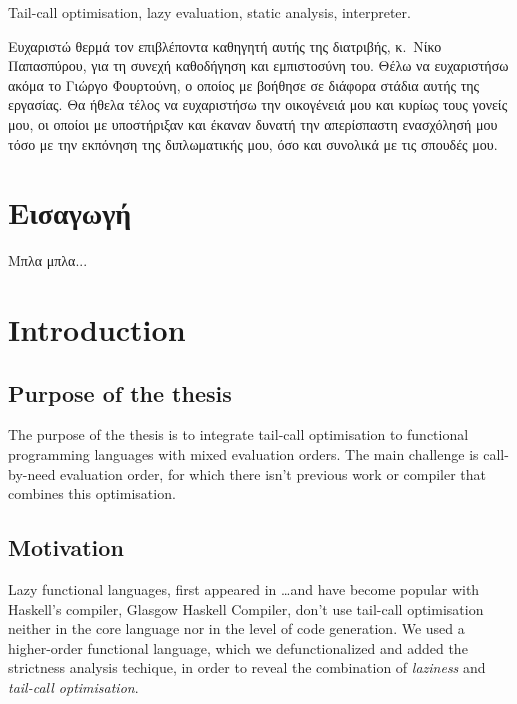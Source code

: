 \documentclass[diploma]{softlab-thesis}
\begin{document}
\begin{abstracten}
\begin{keywordsen}
Tail-call optimisation, lazy evaluation, static analysis, interpreter. 
\end{keywordsen}
\end{abstracten}



\begin{acknowledgementsgr}
Ευχαριστώ θερμά τον επιβλέποντα καθηγητή αυτής της διατριβής,
κ.~Νίκο Παπασπύρου, για τη συνεχή καθοδήγηση και εμπιστοσύνη
του. Θέλω να ευχαριστήσω ακόμα
το Γιώργο Φουρτούνη, ο οποίος με βοήθησε σε
διάφορα στάδια αυτής της εργασίας.  Θα ήθελα τέλος να ευχαριστήσω
την οικογένειά μου και κυρίως τους γονείς μου, οι οποίοι με
υποστήριξαν και έκαναν δυνατή την απερίσπαστη ενασχόλησή μου τόσο
με την εκπόνηση της διπλωματικής μου, όσο και συνολικά με τις
σπουδές μου.
\end{acknowledgementsgr}



\tableofcontents
\listoftables
\listoffigures



\mainmatter

\chapter{Εισαγωγή}
Μπλα μπλα...

\englishtext

\chapter{Introduction}

\section {Purpose of the thesis}
The purpose of the thesis is to integrate tail-call optimisation to
functional programming languages with mixed evaluation orders. The main
challenge is call-by-need evaluation order, for which there isn't previous 
work or compiler that combines this optimisation.

\section {Motivation}
Lazy functional languages, first appeared in \dots and have become popular
with Haskell's compiler, Glasgow Haskell Compiler, don't use tail-call optimisation 
neither in the core language nor in the level of code generation. We used 
a higher-order functional language, which we defunctionalized and added the 
strictness analysis techique, in order to reveal the combination of \textit{laziness}
and \textit{tail-call optimisation}. 
\end{document}
